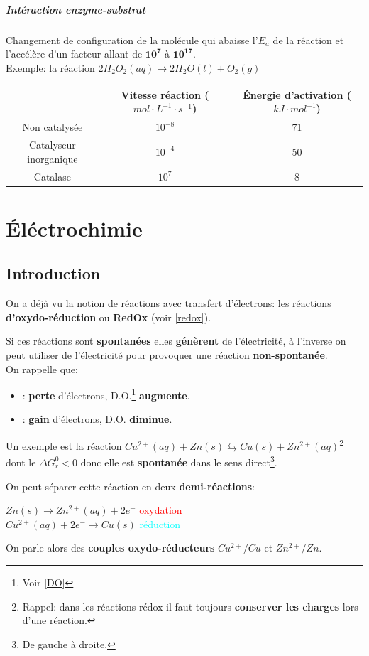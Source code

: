 \documentclass[10pt,a4paper]{book}
\begin{document}
\paragraph{Intéraction enzyme-substrat} Changement de configuration de la molécule qui abaisse l'$E_a$ de la réaction et l’accélère d'un facteur allant de $\mathbf{10^7}$ à $\mathbf{10^{17}}$. \\
Exemple: la réaction \(2H_2O_2(aq) \rightarrow 2H_2O(l) + O_2(g)\)
\begin{center}
\begin{tabular}{| c | c | c |}
\hline
 & Vitesse réaction ($mol\cdot L^{-1}\cdot s^{-1}$) & Énergie d’activation ($kJ\cdot mol^{-1}$) \\
\hline
Non catalysée & $10^{-8}$ & 71 \\
\hline
Catalyseur inorganique & $10^{-4}$ & 50 \\
\hline
Catalase\footnotemark & $10^{7}$ & 8 \\
\hline
\end{tabular}
\end{center}

\chapter{Éléctrochimie}

\section{Introduction}

On a déjà vu la notion de réactions avec transfert d'électrons: les réactions \textbf{d'oxydo-réduction} ou \textbf{RedOx} (voir \ref{redox}). \par
Si ces réactions sont \textbf{spontanées} elles \textbf{génèrent} de l'électricité, à l'inverse on peut utiliser de l'électricité pour provoquer une réaction \textbf{non-spontanée}. \\
On rappelle que:
\begin{itemize}
\item \textbf{\color{red}{Oxydation}}: \textbf{perte} d'électrons, D.O.\footnote{Voir \ref{DO}} \textbf{augmente}.
\item \textbf{\color{cyan}{Réduction}}: \textbf{gain} d'électrons, D.O. \textbf{diminue}.
\end{itemize}
Un exemple est la réaction \(Cu^{2+}(aq) + Zn(s) \leftrightarrows Cu(s) + Zn^{2+}(aq)\)\footnote{Rappel: dans les réactions rédox il faut toujours \textbf{conserver les charges} lors d'une réaction.} dont le $\Delta G^0_r < 0$ donc elle est \textbf{spontanée} dans le sens direct\footnote{De gauche à droite.}. \par
On peut séparer cette réaction en deux \textbf{demi-réactions}:
\begin{center}
\(Zn(s) \rightarrow Zn^{2+}(aq) + 2e^-\) \textcolor{red}{oxydation} \\
\(Cu^{2+}(aq) + 2e^- \rightarrow Cu(s)\) \textcolor{cyan}{réduction}
\end{center}
On parle alors des \textbf{couples oxydo-réducteurs} $Cu^{2+}/Cu$ et $Zn^{2+}/Zn$.
\end{document}
